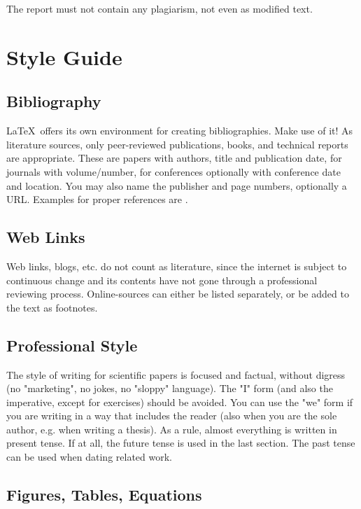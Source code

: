 \documentclass[conference]{IEEEtran}
\begin{document}
The report must not contain any plagiarism, not even as modified text. 


\section{Style Guide}

\subsection{Bibliography}

\noindent \LaTeX\  offers its own environment for creating bibliographies. Make use of it! As literature sources,
only peer-reviewed publications, books, and technical reports are appropriate. These are papers with
authors, title and publication date, for journals with volume/number, for conferences optionally with
conference date and location. You may also name the publisher and page numbers, optionally a URL.
Examples for proper references are \cite{Dyn87,Far02,Lev44,Mar63}.


\subsection{Web Links}
\noindent Web links, blogs, etc. do not count as literature, since the internet is subject to continuous change
and its contents have not gone through a professional reviewing process.
Online-sources can either be listed separately, or be added to the text as footnotes.

\subsection{Professional Style}

\noindent The style of writing for scientific papers is focused and factual, without
digress (no "marketing", no jokes, no "sloppy" language).
The "I" form (and also the imperative, except for exercises) should be avoided.
You can use the "we" form if you are writing in a way that includes the reader
(also when you are the sole author, e.g. when writing a thesis).
As a rule, almost everything is written in present tense. If at all, the future tense is used in the last section.
The past tense can be used when dating related work.

\subsection{Figures, Tables, Equations}
\end{document}
